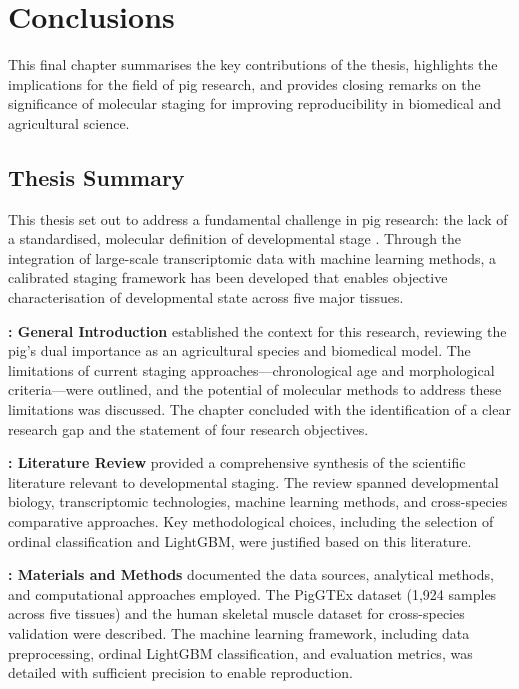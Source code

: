 \chapter{Conclusions}\label{chapter:conclusions}

\clearpage
\FloatBarrier

This final chapter summarises the key contributions of the thesis, highlights the implications for the field of pig research, and provides closing remarks on the significance of molecular staging for improving reproducibility in biomedical and agricultural science.


\section{Thesis Summary}\label{sec:conclusions:summary}

This thesis set out to address a fundamental challenge in pig research: the lack of a standardised, molecular definition of developmental stage \parencite{swindle_swine_2012, boeyer_evidence_2020}. Through the integration of large-scale transcriptomic data with machine learning methods, a calibrated staging framework has been developed that enables objective characterisation of developmental state across five major tissues.

\textbf{: General Introduction} established the context for this research, reviewing the pig's dual importance as an agricultural species and biomedical model. The limitations of current staging approaches---chronological age and morphological criteria---were outlined, and the potential of molecular methods to address these limitations was discussed. The chapter concluded with the identification of a clear research gap and the statement of four research objectives.

\textbf{: Literature Review} provided a comprehensive synthesis of the scientific literature relevant to developmental staging. The review spanned developmental biology, transcriptomic technologies, machine learning methods, and cross-species comparative approaches. Key methodological choices, including the selection of ordinal classification and LightGBM, were justified based on this literature.

\textbf{: Materials and Methods} documented the data sources, analytical methods, and computational approaches employed. The PigGTEx dataset \parencite{teng_compendium_2024, chen_construction_2025} (1,924 samples across five tissues) and the human skeletal muscle dataset \parencite{schaiter_molecular_2024} for cross-species validation were described. The machine learning framework, including data preprocessing, ordinal LightGBM classification, and evaluation metrics, was detailed with sufficient precision to enable reproduction.

